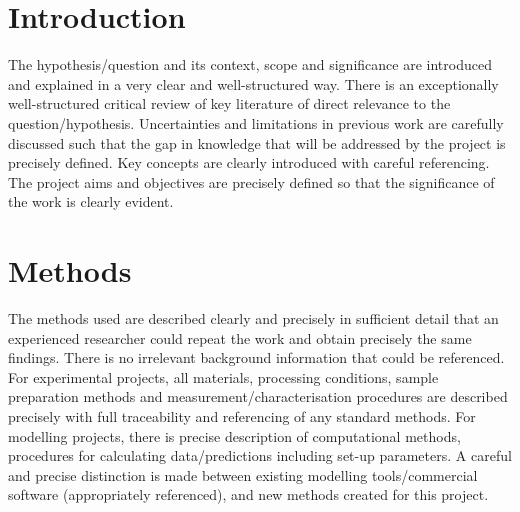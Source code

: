 \documentclass{Academic}
\begin{document}
\myabstract{}
\renewcommand{\myTitle}{A Survey of State of the Art Crop Rotation Prediction Approaches}
\renewcommand{\MyAuthor}{Leon Knorr}
\renewcommand{\MyDepartment}{Mannheim Master of Datascience}
\renewcommand{\ID}{1902854}
\renewcommand{\Keywords}{Agriculture, AI, Crop Rotation}
\maketitle
\onehalfspacing

\section{Introduction}

The hypothesis/question and its context, scope and significance are introduced and explained in a very clear and well-structured way\supercite{einstein}. 
There is an exceptionally well-structured critical review of key literature of direct relevance to the question/hypothesis. Uncertainties and limitations in previous work are carefully discussed such that the gap in knowledge that will be addressed by the project is precisely defined. 
Key concepts are clearly introduced with careful referencing. 
The project aims and objectives are precisely defined so that the significance of the work is clearly evident.

\section{Methods}

The methods used are described clearly and precisely in sufficient detail that an experienced researcher could repeat the work and obtain precisely the same findings. There is no irrelevant background information that could be referenced.
For experimental projects, all materials, processing conditions, sample preparation methods and measurement/characterisation procedures are described precisely with full traceability and referencing of any standard methods.
 For modelling projects, there is precise description of computational methods, procedures for calculating data/predictions including set-up parameters. A careful and precise distinction is made between existing modelling tools/commercial software (appropriately referenced), and new methods created for this project. 
\end{document}
